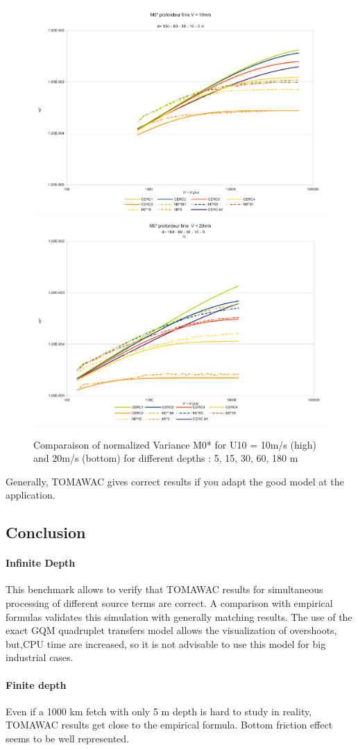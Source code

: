 \begin{figure}
\centering
\includegraphics[scale=0.4]{m0_test7v10.pdf}\\
\includegraphics[scale=0.4]{m0_test7v20.pdf}\\
\caption{Comparaison of normalized Variance M0* for U10 = 10m/s (high) and 20m/s (bottom) for different depths : 5, 15, 30, 60, 180 m}
\label{variancem0}
\end{figure}
Generally, TOMAWAC gives correct results if you adapt the good model at the application.
\subsection{Conclusion}
\paragraph{Infinite Depth}
This benchmark allows to verify that TOMAWAC results for simultaneous processing of different source terms are correct. A comparison with empirical formulas validates this simulation with generally matching results. The use of the exact GQM quadruplet transfers model allows the visualization of overshoots, but,CPU time are increased, so it is not advisable to use this model for big industrial cases.
\paragraph*{Finite depth}
Even if a 1000 km fetch with only 5 m depth is hard to study in reality, TOMAWAC results get close to the empirical formula. Bottom friction effect seems to be well represented.
